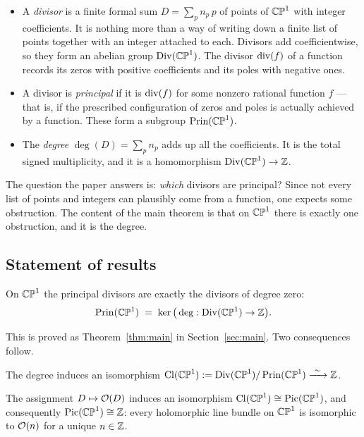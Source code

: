 \begin{itemize}[leftmargin=1.5em,itemsep=0.25em]
\item A \emph{divisor} is a finite formal sum $D = \sum_p n_p\, p$ of points of
$\mathbb{CP}^1$ with integer coefficients. It is nothing more than a way of writing down a
finite list of points together with an integer attached to each. Divisors add
coefficientwise, so they form an abelian group $\operatorname{Div}(\mathbb{CP}^1)$. The divisor
$\operatorname{div}(f)$ of a function records its zeros with positive coefficients and its
poles with negative ones.
\item A divisor is \emph{principal} if it is $\operatorname{div}(f)$ for some nonzero rational
function $f$ --- that is, if the prescribed configuration of zeros and poles is
actually achieved by a function. These form a subgroup $\operatorname{Prin}(\mathbb{CP}^1)$.
\item The \emph{degree} $\deg(D) = \sum_p n_p$ adds up all the coefficients. It
is the total signed multiplicity, and it is a homomorphism $\operatorname{Div}(\mathbb{CP}^1) \to \mathbb{Z}$.
\end{itemize}

The question the paper answers is: \emph{which} divisors are principal? Since not
every list of points and integers can plausibly come from a function, one expects
some obstruction. The content of the main theorem is that on $\mathbb{CP}^1$ there is
exactly one obstruction, and it is the degree.

\subsection{Statement of results}

\begin{namedtheorem}\label{thmA}
On $\mathbb{CP}^1$ the principal divisors are exactly the divisors of degree zero:
\[
\operatorname{Prin}(\mathbb{CP}^1) \;=\; \ker\big(\deg : \operatorname{Div}(\mathbb{CP}^1) \to \mathbb{Z}\big).
\]
\end{namedtheorem}

This is proved as Theorem~\ref{thm:main} in Section~\ref{sec:main}. Two
consequences follow.

\begin{namedtheorem}\label{thmB}
The degree induces an isomorphism $\operatorname{Cl}(\mathbb{CP}^1) := \operatorname{Div}(\mathbb{CP}^1)/\operatorname{Prin}(\mathbb{CP}^1)
\xrightarrow{\ \sim\ } \mathbb{Z}$.
\end{namedtheorem}

\begin{namedtheorem}\label{thmC}
The assignment $D \mapsto \mathcal{O}(D)$ induces an isomorphism $\operatorname{Cl}(\mathbb{CP}^1) \cong
\operatorname{Pic}(\mathbb{CP}^1)$, and consequently $\operatorname{Pic}(\mathbb{CP}^1) \cong \mathbb{Z}$: every holomorphic line bundle
on $\mathbb{CP}^1$ is isomorphic to $\mathcal{O}(n)$ for a unique $n \in \mathbb{Z}$.
\end{namedtheorem}

